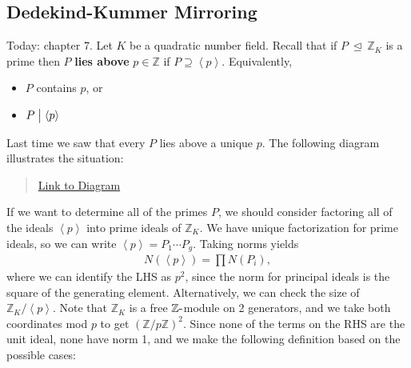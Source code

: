 \hypertarget{dedekind-kummer-mirroring}{%
\subsection{Dedekind-Kummer Mirroring}\label{dedekind-kummer-mirroring}}

\begin{remark}

Today: chapter 7. Let \(K\) be a quadratic number field. Recall that if
\(P {~\trianglelefteq~}{\mathbb{Z}}_K\) is a prime then \(P\)
\textbf{lies above} \(p\in {\mathbb{Z}}\) if
\(P \supseteq \left\langle{ p }\right\rangle\). Equivalently,

\begin{itemize}
\tightlist
\item
  \(P\) contains \(p\), or
\item
  \(P \bigm|\left\langle{ p }\right\rangle\)
\end{itemize}

Last time we saw that every \(P\) lies above a unique \(p\). The
following diagram illustrates the situation:

\begin{center}
\end{center}

\begin{quote}
\href{https://q.uiver.app/?q=WzAsNixbMCwwLCJLIl0sWzAsMiwiXFxRUSJdLFsyLDAsIlxcWlpfSyJdLFsyLDIsIlxcWloiXSxbNCwwLCJQIl0sWzQsMiwicCJdLFswLDEsIiIsMCx7InN0eWxlIjp7ImhlYWQiOnsibmFtZSI6Im5vbmUifX19XSxbMiwzLCIiLDAseyJzdHlsZSI6eyJoZWFkIjp7Im5hbWUiOiJub25lIn19fV0sWzQsNSwiIiwwLHsic3R5bGUiOnsiaGVhZCI6eyJuYW1lIjoibm9uZSJ9fX1dXQ==}{Link
to Diagram}
\end{quote}

If we want to determine all of the primes \(P\), we should consider
factoring all of the ideals \(\left\langle{ p }\right\rangle\) into
prime ideals of \({\mathbb{Z}}_K\). We have unique factorization for
prime ideals, so we can write
\(\left\langle{ p }\right\rangle = P_1 \cdots P_g\). Taking norms yields
\begin{align*}
N( \left\langle{ p }\right\rangle ) = \prod N(P_i) 
,\end{align*}
where we can identify the LHS as \(p^2\), since the norm for principal
ideals is the square of the generating element. Alternatively, we can
check the size of \({\mathbb{Z}}_K/ \left\langle{ p }\right\rangle\).
Note that \({\mathbb{Z}}_K\) is a free \({\mathbb{Z}}{\hbox{-}}\)module
on 2 generators, and we take both coordinates mod \(p\) to get
\(({\mathbb{Z}}/p{\mathbb{Z}})^2\). Since none of the terms on the RHS
are the unit ideal, none have norm 1, and we make the following
definition based on the possible cases:


\end{remark}
